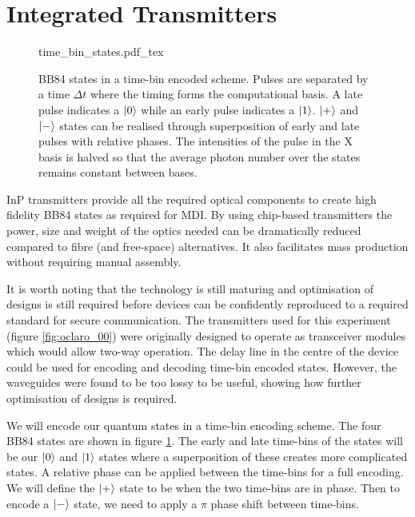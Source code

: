 \section{Integrated Transmitters}

\begin{figure}[tp]
	\centering
	\small
	\def\svgwidth{0.9\textwidth} 
	{time_bin_states.pdf_tex}
	\caption[BB84 time-bin encoding]{BB84 states in a time-bin encoded scheme. Pulses are separated by a time $\Delta t$ where the timing forms the computational basis. A late pulse indicates a $\ket{0}$ while an early pulse indicates a $\ket{1}$. $\ket{+}$ and $\ket{-}$ states can be realised through superposition of early and late pulses with relative phases. The intensities of the pulse in the X basis is halved so that the average photon number over the states remains constant between bases.}
	\label{fig:BB84_time_bin}
\end{figure}

\Ac{InP} transmitters provide all the required optical components to create high fidelity BB84 states as required for \ac{MDI}. By using chip-based transmitters the power, size and weight of the optics needed can be dramatically reduced compared to fibre (and free-space) alternatives. It also facilitates mass production without requiring manual assembly. 

It is worth noting that the technology is still maturing and optimisation of designs is still required before devices can be confidently reproduced to a required standard for secure communication. The transmitters used for this experiment (figure \ref{fig:oclaro_00}) were originally designed to operate as transceiver modules which would allow two-way operation. The delay line in the centre of the device could be used for encoding and decoding time-bin encoded states. However, the waveguides were found to be too lossy to be useful, showing how further optimisation of designs is required.

We will encode our quantum states in a time-bin encoding scheme. The four BB84 states are shown in figure \ref{fig:BB84_time_bin}. The early and late time-bins of the states will be our $\ket{0}$ and $\ket{1}$ states where a superposition of these creates more complicated states. A relative phase can be applied between the time-bins for a full encoding. We will define the $\ket{+}$ state to be when the two time-bins are in phase. Then to encode a $\ket{-}$ state, we need to apply a $\pi$ phase shift between time-bins. 

